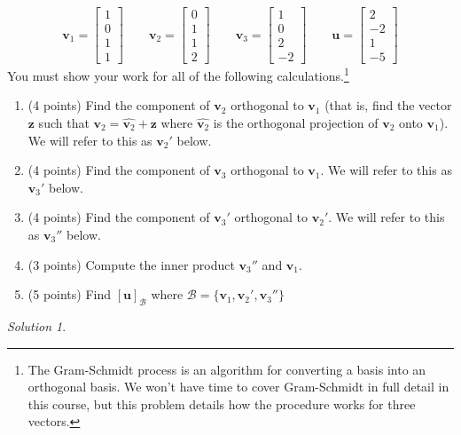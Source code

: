 \documentclass{article}
\theoremstyle{remark}
\newtheorem*{solution}{Solution}
\newcommand{\vv}[1]{\mathbf{#1}}
\begin{document}
\begin{displaymath}
  \vv v_1 =
  \begin{bmatrix}
    1 \\ 0 \\ 1 \\ 1
  \end{bmatrix}
  \qquad
  \vv v_2 =
  \begin{bmatrix}
    0 \\ 1 \\ 1 \\ 2
  \end{bmatrix}
  \qquad
  \vv v_3 =
  \begin{bmatrix}
    1 \\ 0 \\ 2 \\ -2
  \end{bmatrix}
  \qquad
  \vv u =
  \begin{bmatrix}
    2 \\ -2 \\ 1 \\ -5
  \end{bmatrix}
\end{displaymath}
You must show your work for all of the following calculations.\footnote{
The Gram-Schmidt process is an algorithm for converting a basis into an orthogonal basis.
We won't have time to cover Gram-Schmidt in full detail in this course, but this problem details how the procedure works for three vectors.}
\begin{enumerate}
\item (4 points) Find the component of $\vv v_2$ orthogonal to $\vv v_1$ (that is, find the vector $\vv z$ such that $\vv v_2 = \hat{\vv v_2} + \vv z$ where $\hat{\vv v_2}$ is the orthogonal projection of $\vv v_2$ onto $\vv v_1$). We will refer to this as $\vv v_2'$ below.
\item (4 points) Find the component of $\vv v_3$ orthogonal to $\vv v_1$. We will refer to this as $\vv v_3'$ below.
\item (4 points) Find the component of $\vv v_3'$ orthogonal to $\vv v_2'$. We will refer to this as $\vv v_3''$ below.
\item (3 points) Compute the inner product $\vv v_3''$ and $\vv v_1$.
\item (5 points) Find $[\vv u]_{\mathcal B}$ where $\mathcal B = \{\vv v_1, \vv v_2', \vv v_3''\}$
\end{enumerate}
\medskip

\begin{solution}
\end{solution}
\vfill
\end{document}
